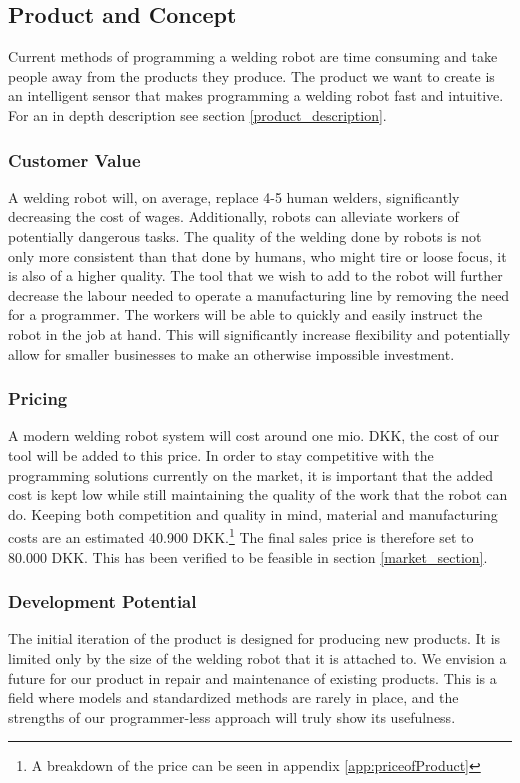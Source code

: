 \subsection{Product and Concept}
Current methods of programming a welding robot are time consuming and take people away from the products they produce.
The product we want to create is an intelligent sensor that makes programming a welding robot fast and intuitive. 
For an in depth description see section \ref{product_description}.
\subsubsection{Customer Value}
A welding robot will, on average, replace 4-5 human welders, significantly decreasing the cost of wages. Additionally, robots can alleviate workers of potentially dangerous tasks. The quality of the welding done by robots is not only more consistent than that done by humans, who might tire or loose focus, it is also of a higher quality. The tool that we wish to add to the robot will further decrease the labour needed to operate a manufacturing line by removing the need for a programmer. The workers will be able to quickly and easily instruct the robot in the job at hand. This will significantly increase flexibility and potentially allow for smaller businesses to make an otherwise impossible investment.

\subsubsection{Pricing}
A modern welding robot system will cost around one mio. DKK, the cost of our tool will be added to this price. In order to stay competitive with the programming solutions currently on the market, it is important that the added cost is kept low while still maintaining the quality of the work that the robot can do. Keeping both competition and quality in mind, material and manufacturing costs are an estimated 40.900 DKK.\footnote{A breakdown of the price can be seen in appendix \ref{app:priceofProduct}} 
The final sales price is therefore set to 80.000 DKK. This has been verified to be feasible in section \ref{market_section}.

\subsubsection{Development Potential}
The initial iteration of the product is designed for producing new products. It is limited only by the size of the welding robot that it is attached to. We envision a future for our product in repair and maintenance of existing products. This is a field where models and standardized methods are rarely in place, and the strengths of our programmer-less approach will truly show its usefulness.

